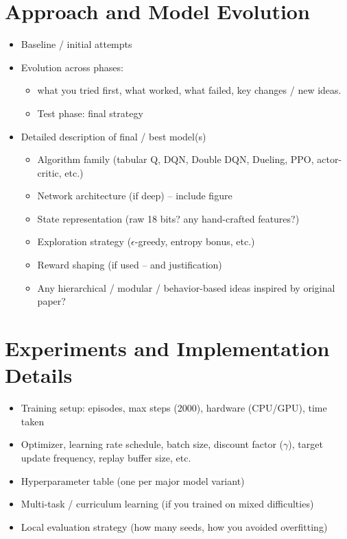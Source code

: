 \documentclass[11pt, oneside]{article}   	%
\begin{document}
\section{Approach and Model Evolution}
\begin{itemize}
    \item Baseline / initial attempts
    \item Evolution across phases:
        \begin{itemize}
            \item what you tried first, what worked, what failed, key changes / new ideas.
            \item Test phase: final strategy
        \end{itemize}
    \item Detailed description of final / best model(s)
        \begin{itemize}
            \item Algorithm family (tabular Q, DQN, Double DQN, Dueling, PPO, actor-critic, etc.)
            \item Network architecture (if deep) – include figure
            \item State representation (raw 18 bits? any hand-crafted features?)
            \item Exploration strategy ($\epsilon$-greedy, entropy bonus, etc.)
            \item Reward shaping (if used – and justification)
            \item Any hierarchical / modular / behavior-based ideas inspired by original paper?
        \end{itemize}
\end{itemize}

\section{Experiments and Implementation Details}
\begin{itemize}
    \item Training setup: episodes, max steps (2000), hardware (CPU/GPU), time taken
    \item Optimizer, learning rate schedule, batch size, discount factor ($\gamma$), target update frequency, replay buffer size, etc.
    \item Hyperparameter table (one per major model variant)
    \item Multi-task / curriculum learning (if you trained on mixed difficulties)
    \item Local evaluation strategy (how many seeds, how you avoided overfitting)
\end{itemize}
\end{document}
